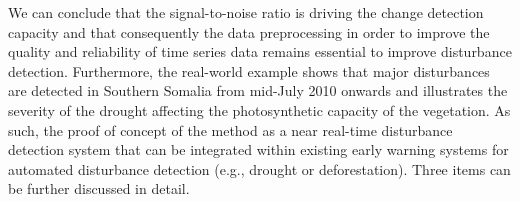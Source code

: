 \documentclass[authoryear,preprint,review,10pt]{elsarticle}
\begin{document}
We can conclude that the signal-to-noise ratio is driving the change detection capacity and that consequently the data preprocessing in order to improve the quality and reliability of time series data remains essential to improve disturbance detection. Furthermore, the real-world example shows that major disturbances are detected in Southern Somalia from mid-July 2010 onwards and illustrates the severity of the drought affecting the photosynthetic capacity of the vegetation. As such, the proof of concept of the method as a near real-time disturbance detection system that can be integrated within existing early warning systems for automated disturbance detection (e.g., drought or deforestation). Three items can be further discussed in detail.

\end{document}
